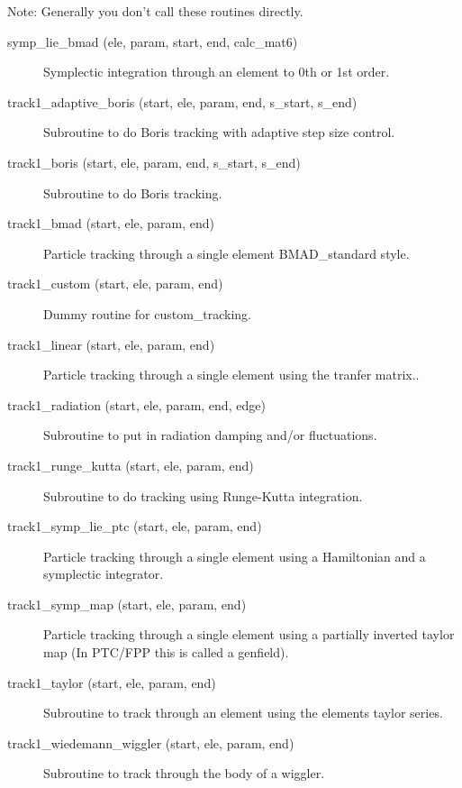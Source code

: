 Note: Generally you don't call these routines directly.

\begin{description}

\item[symp\_lie\_bmad (ele, param, start, end, calc\_mat6)] \Newline
Symplectic integration through an element to 0th or 1st order.

\item[track1\_adaptive\_boris (start, ele, param, end, s\_start, s\_end)] \Newline
Subroutine to do Boris tracking with adaptive step size control. 

\item[track1\_boris (start, ele, param, end, s\_start, s\_end)] \Newline
Subroutine to do Boris tracking.  

\item[track1\_bmad (start, ele, param, end)] \Newline
Particle tracking through a single element BMAD\_standard style. 

\item[track1\_custom (start, ele, param, end)] \Newline
Dummy routine for custom\_tracking.

\item[track1\_linear (start, ele, param, end)] \Newline
Particle tracking through a single element using the tranfer matrix.. 

\item[track1\_radiation (start, ele, param, end, edge)] \Newline
Subroutine to put in radiation damping and/or fluctuations. 

\item[track1\_runge\_kutta (start, ele, param, end)] \Newline
Subroutine to do tracking using Runge-Kutta integration. 

\item[track1\_symp\_lie\_ptc (start, ele, param, end)] \Newline
Particle tracking through a single element using a Hamiltonian and a 
symplectic integrator. 

\item[track1\_symp\_map (start, ele, param, end)] \Newline
Particle tracking through a single element using a partially inverted 
taylor map (In PTC/FPP this is called a genfield). 

\item[track1\_taylor (start, ele, param, end)] \Newline
Subroutine to track through an element using the elements taylor series. 

\item[track1\_wiedemann\_wiggler (start, ele, param, end)] \Newline
Subroutine to track through the body of a wiggler. 

\end{description}


